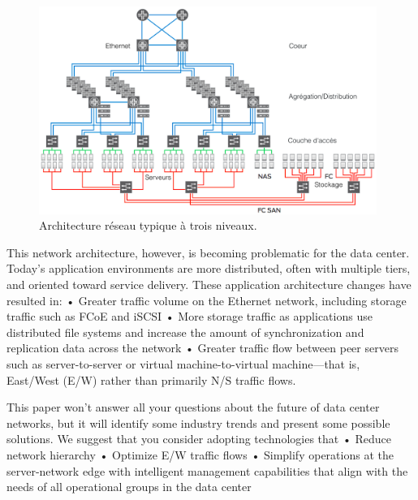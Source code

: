 \begin{figure}[h]
\begin{center}
\includegraphics[width=0.98\textwidth]{images/LegacyNetworkArchitecture} 
\caption{Architecture réseau typique à trois niveaux. \cite{cloudReadyNetworkJuniper}} \label{legacy_archi}
\end{center}
\end{figure}

This network architecture, however, is becoming problematic for the data center. Today’s application environments are more distributed, often with multiple tiers, and oriented toward service delivery. These application architecture changes have resulted in:
• Greater traffic volume on the Ethernet network, including storage traffic such as FCoE and iSCSI
• More storage traffic as applications use distributed file systems and increase the amount of
synchronization and replication data across the network
• Greater traffic flow between peer servers such as server-to-server or virtual machine-to-virtual machine—that is, East/West (E/W) rather than primarily N/S traffic flows.

This paper won’t answer all your questions about the future of data center networks, but it will identify some industry trends and present some possible solutions. We suggest that you consider adopting technologies that
• Reduce network hierarchy
• Optimize E/W traffic flows
• Simplify operations at the server-network edge with intelligent management capabilities that align with the needs of all operational groups in the data center


